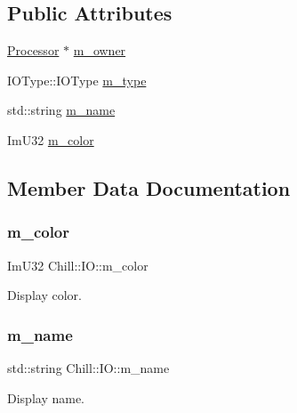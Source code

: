 \subsection*{Public Attributes}
\begin{DoxyCompactItemize}
\item 
\mbox{\hyperlink{class_chill_1_1_processor}{Processor}} $\ast$ \mbox{\hyperlink{class_chill_1_1_i_o_a88eff91ac0f77cf4c9d307615452f365}{m\+\_\+owner}}
\item 
I\+O\+Type\+::\+I\+O\+Type \mbox{\hyperlink{class_chill_1_1_i_o_adc235c7126e87e8af02631b5b9a94b0a}{m\+\_\+type}}
\item 
std\+::string \mbox{\hyperlink{class_chill_1_1_i_o_a1f41050855e77ca7aeb97fff0c59f59a}{m\+\_\+name}}
\item 
Im\+U32 \mbox{\hyperlink{class_chill_1_1_i_o_a1bba12c357581b8b61c2bde579f4078b}{m\+\_\+color}}
\end{DoxyCompactItemize}


\subsection{Member Data Documentation}
\mbox{\label{class_chill_1_1_i_o_a1bba12c357581b8b61c2bde579f4078b}} 
\subsubsection{\texorpdfstring{m\+\_\+color}{m\_color}}
{\footnotesize\ttfamily Im\+U32 Chill\+::\+I\+O\+::m\+\_\+color}

Display color. \mbox{\label{class_chill_1_1_i_o_a1f41050855e77ca7aeb97fff0c59f59a}} 
\subsubsection{\texorpdfstring{m\+\_\+name}{m\_name}}
{\footnotesize\ttfamily std\+::string Chill\+::\+I\+O\+::m\+\_\+name}

Display name. \mbox{\label{class_chill_1_1_i_o_a88eff91ac0f77cf4c9d307615452f365}} 
